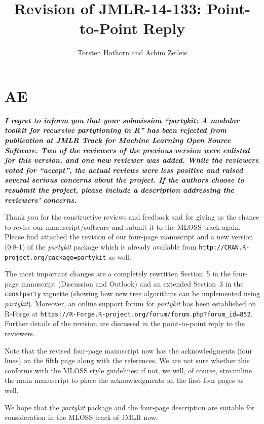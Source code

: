 \documentclass{article}
\title{Revision of JMLR-14-133: Point-to-Point Reply}
\author{Torsten Hothorn and Achim Zeileis}
\begin{document}
\maketitle

\section*{AE}

\textbf{\textit{%
I regret to inform you that your submission ``partykit: A modular toolkit
for recursive partytioning in R'' has been rejected from publication at JMLR
Track for Machine Learning Open Source Software.  Two of the reviewers of
the previous version were enlisted for this version, and one new reviewer
was added.  While the reviewers voted for ``accept'', the actual reviews
were less positive and raised several serious concerns about the project. 
If the authors choose to resubmit the project, please include a description
addressing the reviewers' concerns.
}}

\smallskip

Thank you for the constructive reviews and feedback and for giving us the
chance to revise our manuscript/software and submit it to the MLOSS track
again. Please find attached the revision of our four-page manuscript
and a new version (0.8-1) of the \emph{partykit} package which is already
available from \texttt{http://CRAN.R-project.org/package=partykit} as well.

The most important changes are a completely rewritten Section~5 in the four-page
manuscript (Discussion and Outlook) and an extended Section~3 in the \texttt{constparty}
vignette (showing how new tree algorithms can be implemented using \emph{partykit}).
Moreover, an online support forum for \emph{partykit} has been established
on \textsf{R}-Forge at \texttt{https://R-Forge.R-project.org/forum/forum.php?forum\_id=852}.
Further details of the revision are discussed in the point-to-point reply
to the reviewers.

Note that the revised four-page manuscript now has the acknowledgments (four lines)
on the fifth page along with the references. We are not sure whether this
conforms with the MLOSS style guidelines: if not, we will, of course, streamline
the main manuscript to place the acknowledgments on the first four pages as well.

We hope that the \emph{partykit} package and the four-page description are
suitable for consideration in the MLOSS track of JMLR now.
\end{document}
